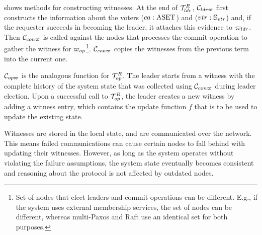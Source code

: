  shows methods for constructing witnesses.
At the end of $\mathcal{T}^{R}_{ldr}$, $\mathcal{C}_{ldr\varpi}$ first constructs the information about the
voters ($ca:\mathrm{ASET}$) and ($vtr:\mathbb{S}_{vtr}$) and, if the requester succeeds in becoming the leader,
it attaches this evidence to ${\varpi_{ldr}}$. Then $\mathcal{C}_{con\varpi}$ is called against
the nodes that processes the commit operation to gather the witness for
${\varpi_{op}}$\footnote{Set of nodes that elect leaders and commit operations
can be different. E.g., if the system uses external membership services,
the set of nodes can be different, whereas multi-Paxos and Raft use an identical
set for both purposes.}.
$\mathcal{C}_{con\varpi}$ copies the witnesses from the previous term into the current one.

%

$\mathcal{C}_{op\varpi}$ is the analogous function for $\mathcal{T}^{R}_{op}$.
The leader starts from a witness with the complete history of the system state
that was collected using $\mathcal{C}_{con\varpi}$ during leader election.
Upon a successful call to $\mathcal{T}^{R}_{op}$, the leader creates a new witness by
adding a witness entry, which contains the update function $f$ that is to be used
to update the existing state.

Witnesses are stored in the local state, and are communicated over the network.
This means failed communications can
cause certain nodes to fall behind with updating their witnesses.
However, as long as the system operates without violating the failure 
assumptions, the system state eventually becomes consistent and reasoning 
about the protocol is not affected by outdated nodes.



